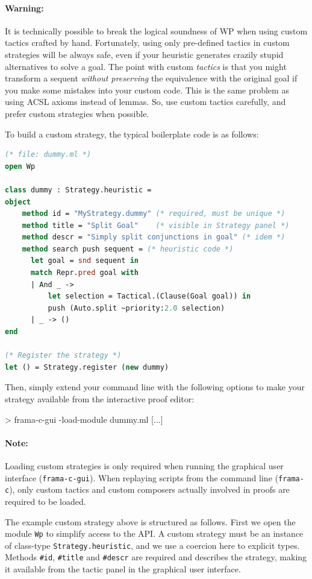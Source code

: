 \paragraph{Warning:} It is technically possible to break the logical soundness of \textsf{WP} when using custom tactics crafted by hand. Fortunately, using only pre-defined tactics in custom strategies will be always safe, even if your heuristic generates crazily stupid alternatives to solve a goal. The point with custom \emph{tactics} is that you might transform a sequent \emph{without preserving} the equivalence with the original goal if you make some mistakes into your custom code. This is the same problem as using \textsf{ACSL} axioms instead of lemmas. So, use custom tactics carefully, and prefer custom strategies when possible.

To build a custom strategy, the typical boilerplate code is as follows:
\begin{lstlisting}[language=ocaml]
 (* file: dummy.ml *)
open Wp

class dummy : Strategy.heuristic =
object
    method id = "MyStrategy.dummy" (* required, must be unique *)
    method title = "Split Goal"    (* visible in Strategy panel *)
    method descr = "Simply split conjunctions in goal" (* idem *)
    method search push sequent = (* heuristic code *)
      let goal = snd sequent in
      match Repr.pred goal with
      | And _ ->
          let selection = Tactical.(Clause(Goal goal)) in
          push (Auto.split ~priority:2.0 selection)
      | _ -> ()
end

(* Register the strategy *)
let () = Strategy.register (new dummy)
\end{lstlisting}

Then, simply extend your command line with the following options to make your strategy available from the interactive proof editor:
\begin{logs}
> frama-c-gui -load-module dummy.ml [...]
\end{logs}

\paragraph{Note:} Loading custom strategies is only required when running the graphical user interface (\texttt{frama-c-gui}). When replaying scripts from the command line (\texttt{frama-c}), only custom tactics and custom composers actually involved in proofs are required to be loaded.

The example custom strategy above is structured as follows. First we open the module \lstinline$Wp$ to simplify
access to the API. A custom strategy must be an instance of class-type \lstinline$Strategy.heuristic$, and we use a coercion here to explicit types. Methods \lstinline$#id$, \lstinline$#title$ and \lstinline$#descr$ are required and describes the strategy, making it available from the tactic panel in the graphical user interface.

